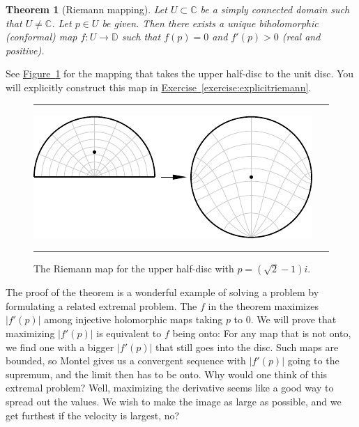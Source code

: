 \documentclass[12pt,openany]{book}
\newcommand{\sabs}[1]{\lvert {#1} \rvert}
\newcommand{\C}{{\mathbb{C}}}
\newcommand{\D}{{\mathbb{D}}}
\theoremstyle{plain}
\newtheorem{thm}{Theorem}[section]
\theoremstyle{remark}
\theoremstyle{definition}
\newenvironment{myfig}{%
\begin{figure}[h!t]
\noindent\rule{\textwidth}{0.5pt}\vspace{12pt}\par\centering}%
{\par\noindent\rule{\textwidth}{0.5pt}
\end{figure}}
\theoremstyle{exercise}
\theoremstyle{example}
\newcommand{\figureref}[1]{\hyperref[#1]{Figure~\ref*{#1}}}
\newcommand{\exerciseref}[1]{\hyperref[#1]{Exercise~\ref*{#1}}}
\begin{document}
\begin{thm}[Riemann mapping]\label{thm:RMT}
Let $U \subset \C$ be a simply connected domain such that $U \not= \C$.
Let $p \in U$ be given.  Then there exists a unique biholomorphic (conformal)
map $f \colon U \to \D$ such that $f(p) = 0$ and
$f'(p) > 0$ (real and positive).
\end{thm}

See \figureref{fig:riemannmap} for the mapping that takes the
upper half-disc to the unit disc.  You will explicitly construct this map in
\exerciseref{exercise:explicitriemann}.

\begin{myfig}
\includegraphics{figures/riemannmap}
\caption{The Riemann map for the upper half-disc with $p=(\sqrt{2}-1)i$.%
\label{fig:riemannmap}}
\end{myfig}

The proof of the theorem is a wonderful example of solving
a problem by formulating a related extremal problem.  The $f$
in the theorem maximizes
$\sabs{f'(p)}$ among injective holomorphic maps taking $p$ to $0$.
We will prove that maximizing $\sabs{f'(p)}$ is equivalent to $f$ being
onto:
For any map that is not onto, we find one with a bigger
$\sabs{f'(p)}$ that still goes into the disc.  Such maps are bounded,
so Montel gives us a convergent sequence with $\sabs{f'(p)}$
going to the supremum, and the limit then has to be onto.
Why would one think of this extremal problem?  Well,
maximizing the derivative seems like a good way to spread out the values.
We wish to make the image as large as possible, and we get furthest if the
velocity is largest, no?
\end{document}
